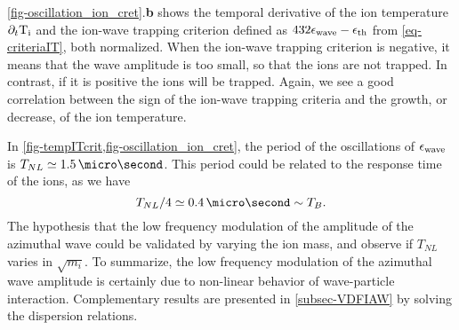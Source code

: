     \cref{fig-oscillation_ion_cret}.{\bf b} shows the temporal derivative of the ion temperature $\partial_t \mathrm{T_i}$ and the ion-wave trapping criterion defined as $432\epsilon_{\rm wave} - \epsilon_{\rm th}$ from \cref{eq-criteriaIT}, both normalized.
    When the ion-wave trapping criterion is negative, it means that the wave amplitude is too small, so that the ions are not trapped.
    In contrast, if it is positive the ions will be trapped.
    Again, we see a good correlation between the sign of the ion-wave trapping criteria and the growth, or decrease, of the ion temperature.
    
    In \cref{fig-tempITcrit,fig-oscillation_ion_cret}, the period of the oscillations of $\epsilon_{\rm wave}$ is $T_{NL} \simeq 1.5\,\micro\second$.
    This period could be related to the response time of the ions, as we have $$T_{NL}/4 \simeq 0.4\,\micro\second \sim T_B.$$
    The hypothesis that the low frequency modulation of the amplitude of the azimuthal wave could be validated by varying the ion mass, and observe if $T_{NL}$ varies in $\sqrt{m_i}$.    
    To summarize, the low frequency modulation of the azimuthal wave amplitude is certainly due to non-linear behavior of wave-particle interaction.
    Complementary results are presented in \cref{subsec-VDFIAW} by solving the dispersion relations.
    

